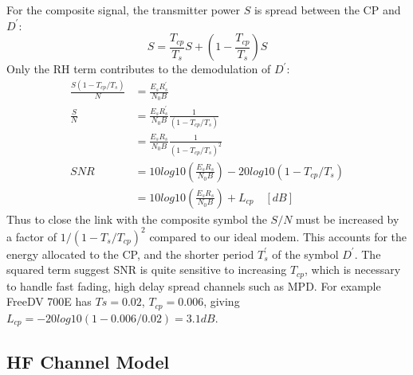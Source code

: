 \documentclass{article}
\begin{document}
For the composite signal, the transmitter power $S$ is spread between the CP and $D^\prime$: 
\begin{equation}
S = \frac{T_{cp}}{T_s}S + \left(1 - \frac{T_{cp}}{T_s} \right)S
\end{equation}
Only the RH term contributes to the demodulation of $D^\prime$:
\begin{equation}
\begin{split}
\frac{S(1-T_{cp}/T_s)}{N} &= \frac{E_sR^\prime_s}{N_0B} \\
\frac{S}{N} &= \frac{E_sR^\prime_s}{N_0B}\frac{1}{(1-T_{cp}/T_s)}\\
            &= \frac{E_sR_s}{N_0B}\frac{1}{(1-T_{cp}/T_s)^2} \\
SNR         &= 10log10 \left( \frac{E_sR_s}{N_0B} \right) - 20log10(1-T_{cp}/T_s) \\
            &= 10log10 \left( \frac{E_sR_s}{N_0B} \right) + L_{cp} \quad [\si{dB}]
\end{split}
\end{equation}
Thus to close the link with the composite symbol the $S/N$ must be increased by a factor of $1/(1 - {T_s}/T_{cp})^2$ compared to our ideal modem.  This accounts for the energy allocated to the CP, and the shorter period $T^\prime_s$ of the symbol $D^\prime$.  The squared term suggest SNR is quite sensitive to increasing $T_{cp}$, which is necessary to handle fast fading, high delay spread channels such as MPD. For example FreeDV 700E has $Ts=0.02$, $T_{cp}=0.006$, giving $L_{cp}=-20log10(1-0.006/0.02)=3.1 \si{dB}$.

\subsection{HF Channel Model}
\end{document}
